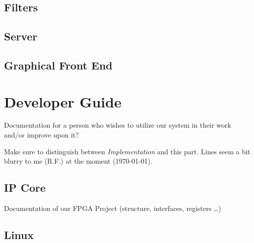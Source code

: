 \documentclass[a4paper,oneside]{alpenthesis/alpenthesis}
\begin{document}
\chapter{Filters} %
\label{ch:filters}


\chapter{Server} %
\label{ch:server}


\chapter{Graphical Front End} %
\label{ch:graphical_front_end}



\part{Developer Guide} %
\label{part:Developer_Guide}
Documentation for a person who wishes to utilize our system in their work and/or
improve upon it?

Make sure  to distinguish  between \emph{Implementation} and  this part. Lines
seem a bit blurry to me (R.F.) at the moment (\today).

\chapter{IP Core} %
\label{ch:IP_Core}
Documentation of our FPGA Project (structure, interfaces, registers \ldots)


\chapter{Linux} %
\label{ch:Linux}
\end{document}
